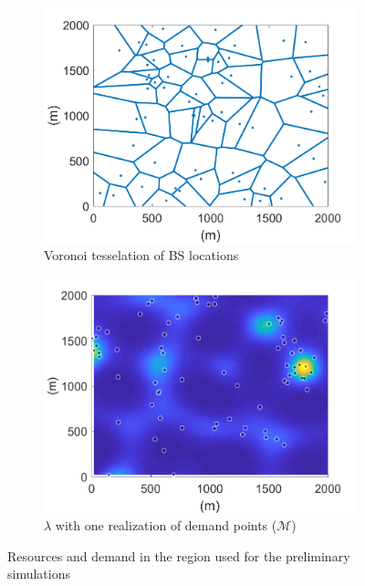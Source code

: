 \documentclass[12pt,dvipsnames]{report}
\begin{document}
\begin{figure}[htp]
	\centering
	\begin{subfigure}{.49\textwidth}
		\centering
		\includegraphics[width=1\linewidth]{Figures/Prelim_BSLocationsVoronoi}
		\caption{\small Voronoi tesselation of BS locations}
		\label{fig:Prelim_BSLocVor}
	\end{subfigure} \hfill
	\begin{subfigure}{.49\textwidth}
		\centering
		\includegraphics[width=1\linewidth]{Figures/Prelim_SSLTnsPPP_demandpointreal}
		\caption{\small $\lambda$ with one realization of demand points ($\mathcal{M}$)}
		\label{fig:Prelim_SSLTDPReal}
	\end{subfigure}
	\caption{Resources and demand in the region used for the preliminary simulations}
	\label{fig:Prelim_NetworkArea}
\end{figure}
\end{document}
